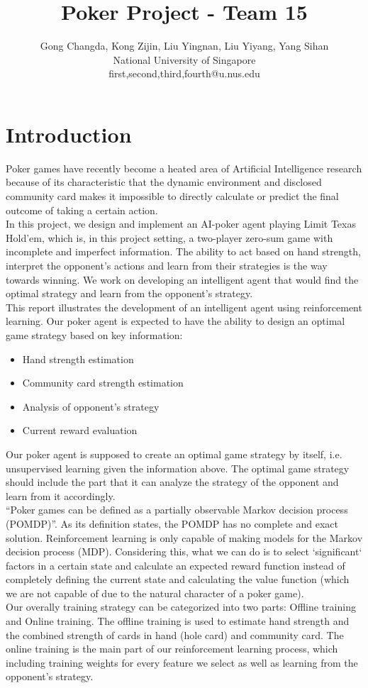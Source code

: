 \documentclass{article}
\title{Poker Project - Team 15}
\author{
Gong Changda, Kong Zijin, Liu Yingnan, Liu Yiyang, Yang Sihan
\\ 
National University of Singapore\\
%
first,second,third,fourth@u.nus.edu
}
\begin{document}
\maketitle

\section{Introduction}
Poker games have recently become a heated area of Artificial Intelligence research because of its characteristic that the dynamic environment and disclosed community card makes it impossible to directly calculate or predict the final outcome of taking a certain action. 
\\In this project, we design and implement an AI-poker agent playing Limit Texas Hold’em, which is, in this project setting, a two-player zero-sum game with incomplete and imperfect information. The ability to act based on hand strength, interpret the opponent’s actions and learn from their strategies is the way towards winning. We work on developing an intelligent agent that would find the optimal strategy and learn from the opponent’s strategy.
\\This report illustrates the development of an intelligent agent using reinforcement learning. Our poker agent is expected to have the ability to design an optimal game strategy based on key information:
\begin{itemize}
	\item Hand strength estimation
	\item Community card strength estimation
	\item Analysis of opponent’s strategy
	\item Current reward evaluation
\end{itemize}
Our poker agent is supposed to create an optimal game strategy by itself, i.e. unsupervised learning given the information above. The optimal game strategy should include the part that it can analyze the strategy of the opponent and learn from it accordingly.
\\“Poker games can be defined as a partially observable Markov decision process (POMDP)”. As its definition states, the POMDP has no complete and exact solution. Reinforcement learning is only capable of making models for the Markov decision process (MDP). Considering this, what we can do is to select `significant` factors in a certain state and calculate an expected reward function instead of completely defining the current state and calculating the value function (which we are not capable of due to the natural character of a poker game).
\\Our overally training strategy can be categorized into two parts: Offline training and Online training. The offline training is used to estimate hand strength and the combined strength of cards in hand (hole card) and community card. The online training is the main part of our reinforcement learning process, which including training weights for every feature we select as well as learning from the opponent’s strategy. 
\end{document}
